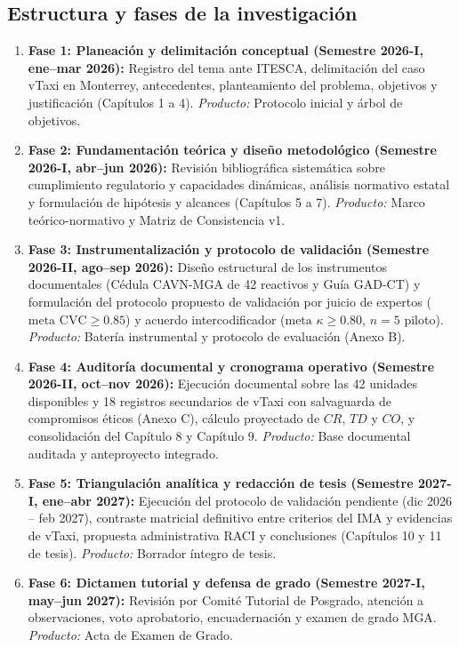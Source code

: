 {\subsection{Estructura y fases de la investigación}
\begin{enumerate}
    \item \textbf{Fase 1: Planeación y delimitación conceptual (Semestre 2026-I, ene--mar 2026):} Registro del tema ante ITESCA, delimitación del caso vTaxi en Monterrey, antecedentes, planteamiento del problema, objetivos y justificación (Capítulos 1 a 4). \textit{Producto:} Protocolo inicial y árbol de objetivos.
    \item \textbf{Fase 2: Fundamentación teórica y diseño metodológico (Semestre 2026-I, abr--jun 2026):} Revisión bibliográfica sistemática sobre cumplimiento regulatorio y capacidades dinámicas, análisis normativo estatal y formulación de hipótesis y alcances (Capítulos 5 a 7). \textit{Producto:} Marco teórico-normativo y Matriz de Consistencia v1.
    \item \textbf{Fase 3: Instrumentalización y protocolo de validación (Semestre 2026-II, ago--sep 2026):} Diseño estructural de los instrumentos documentales (Cédula CAVN-MGA de 42 reactivos y Guía GAD-CT) y formulación del protocolo propuesto de validación por juicio de expertos ($\text{meta CVC} \ge 0.85$) y acuerdo intercodificador ($\text{meta }\kappa \ge 0.80$, $n = 5$ piloto). \textit{Producto:} Batería instrumental y protocolo de evaluación (Anexo B).
    \item \textbf{Fase 4: Auditoría documental y cronograma operativo (Semestre 2026-II, oct--nov 2026):} Ejecución documental sobre las 42 unidades disponibles y 18 registros secundarios de vTaxi con salvaguarda de compromisos éticos (Anexo C), cálculo proyectado de $CR$, $TD$ y $CO$, y consolidación del Capítulo 8 y Capítulo 9. \textit{Producto:} Base documental auditada y anteproyecto integrado.
    \item \textbf{Fase 5: Triangulación analítica y redacción de tesis (Semestre 2027-I, ene--abr 2027):} Ejecución del protocolo de validación pendiente (dic 2026 -- feb 2027), contraste matricial definitivo entre criterios del IMA y evidencias de vTaxi, propuesta administrativa RACI y conclusiones (Capítulos 10 y 11 de tesis). \textit{Producto:} Borrador íntegro de tesis.
    \item \textbf{Fase 6: Dictamen tutorial y defensa de grado (Semestre 2027-I, may--jun 2027):} Revisión por Comité Tutorial de Posgrado, atención a observaciones, voto aprobatorio, encuadernación y examen de grado MGA. \textit{Producto:} Acta de Examen de Grado.
\end{enumerate}

}
